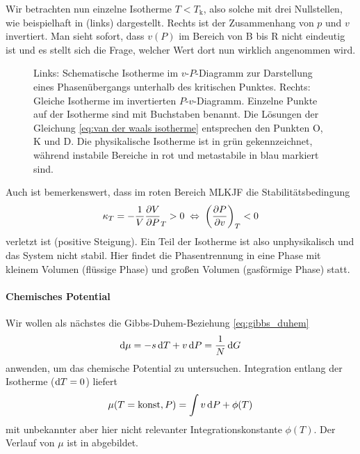 Wir betrachten nun einzelne Isotherme $T<T_\mathrm{k}$, also solche mit drei Nullstellen, wie beispielhaft in  (links) dargestellt. Rechts ist der Zusammenhang von $p$ und $v$ invertiert. Man sieht sofort, dass $v(P)$ im Bereich von B bis R nicht eindeutig ist und es stellt sich die Frage, welcher Wert dort nun wirklich angenommen wird.

\begin{figure}[htbp]
    \centering
    \tfigPhaseSeparation
    \tfigPhaseSeparationInverted
    \caption{Links: Schematische Isotherme im $v$-$P$-Diagramm zur Darstellung eines Phasenübergangs unterhalb des kritischen Punktes. Rechts: Gleiche Isotherme im invertierten $P$-$v$-Diagramm.
        Einzelne Punkte auf der Isotherme sind mit Buchstaben benannt. Die Lösungen der Gleichung \eqref{eq:van der waals isotherme} entsprechen den Punkten O, K und D. Die physikalische Isotherme ist in grün gekennzeichnet, während instabile Bereiche in rot und metastabile in blau markiert sind. }
    \label{fig:PhaseSeparation}
\end{figure}

Auch ist bemerkenswert, dass im roten Bereich MLKJF die Stabilitätsbedingung
\begin{align*}
    \kappa_T=-\frac{1}{V}\frac{\partial V}{\partial P}_T>0 \;\Leftrightarrow\; \left( \frac{\partial P}{\partial v} \right)_T<0
\end{align*}
verletzt ist (positive Steigung). Ein Teil der Isotherme ist also unphysikalisch und das System nicht stabil. Hier findet die Phasentrennung in eine Phase mit kleinem Volumen (flüssige Phase) und großen Volumen (gasförmige Phase) statt.

\paragraph*{Chemisches Potential}

Wir wollen als nächstes die Gibbs-Duhem-Beziehung \eqref{eq:gibbs_duhem}
\begin{align*}
    \mathop{}\!\mathrm{d}\mu=-s\mathop{}\!\mathrm{d} T+v\mathop{}\!\mathrm{d} P=\frac{1}{N}\mathop{}\!\mathrm{d} G
\end{align*}
anwenden, um das chemische Potential zu untersuchen. Integration entlang der Isotherme ($\mathop{}\!\mathrm{d} T=0$) liefert
\begin{align*}
    \mu(T=\mathrm{konst},P) = \int v\mathop{}\!\mathrm{d} P +\phi(T)
\end{align*}
mit unbekannter aber hier nicht relevanter Integrationskonstante $\phi(T)$. Der Verlauf von $\mu$ ist in  abgebildet.

